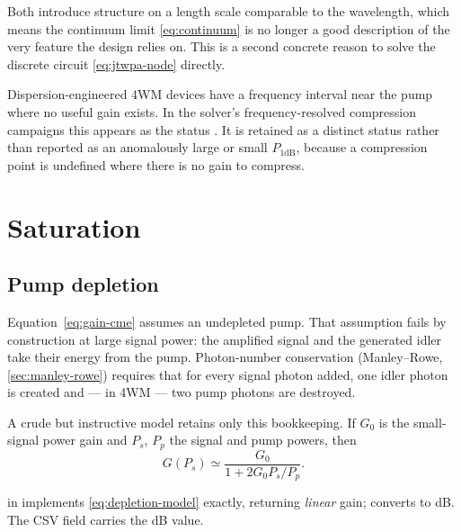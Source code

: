 Both introduce structure on a length scale comparable to the wavelength, which
means the continuum limit \eqref{eq:continuum} is no longer a good description
of the very feature the design relies on. This is a second concrete reason to
solve the discrete circuit \eqref{eq:jtwpa-node} directly.

\begin{caveat}
Dispersion-engineered 4WM devices have a frequency interval near the pump where
no useful gain exists. In the solver's frequency-resolved compression campaigns
this appears as the status . It is retained
as a distinct status rather than reported as an anomalously large or small
$P_{1\mathrm{dB}}$, because a compression point is undefined where there is no
gain to compress.
\end{caveat}

\section{Saturation}

\subsection{Pump depletion}

Equation~\eqref{eq:gain-cme} assumes an undepleted pump. That assumption fails
by construction at large signal power: the amplified signal and the generated
idler take their energy from the pump. Photon-number conservation
(Manley--Rowe, \cref{sec:manley-rowe}) requires that for every signal photon
added, one idler photon is created and --- in 4WM --- two pump photons are
destroyed.

A crude but instructive model retains only this bookkeeping. If $G_0$ is the
small-signal power gain and $P_s$, $P_p$ the signal and pump powers, then
\begin{equation}
  G(P_s) \simeq \frac{G_0}{1 + 2G_0 P_s/P_p}.
  \label{eq:depletion-model}
\end{equation}

\begin{implnote}
 in 
implements \eqref{eq:depletion-model} exactly, returning \emph{linear} gain;
 converts to \si{\dB}. The CSV field
 carries the \si{\dB} value.
\end{implnote}

